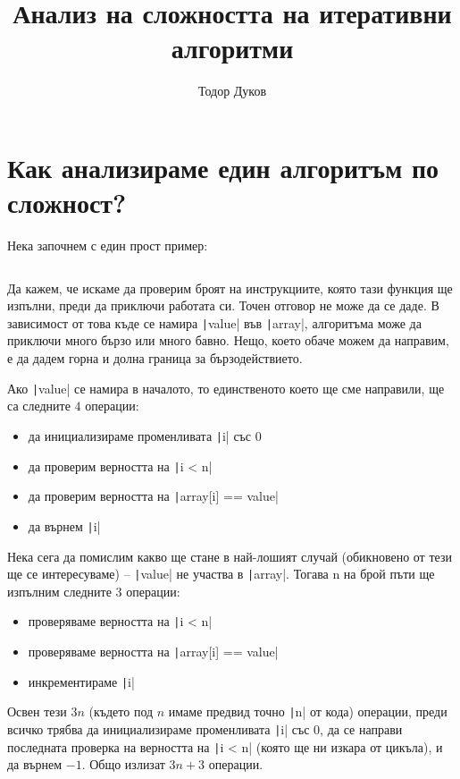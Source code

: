 \documentclass{article}
\title{Анализ на сложността на итеративни алгоритми}
\author{Тодор Дуков}
\date{}
\theoremstyle{definition}
\theoremstyle{plain}
\theoremstyle{remark}
\theoremstyle{definition}
\begin{document}
\maketitle

\section*{Как анализираме един алгоритъм по сложност?}

Нека започнем с един прост пример:

\inputminted[linenos]{c++}{algorithms/find.cpp}

Да кажем, че искаме да проверим броят на инструкциите, която тази функция ще изпълни, преди да приключи работата си.
Точен отговор не може да се даде.
В зависимост от това къде се намира \texttt|value| във \texttt|array|, алгоритъма може да приключи много бързо или много бавно.
Нещо, което обаче можем да направим, е да дадем горна и долна граница за бързодействието.

Ако \texttt|value| се намира в началото, то единственото което ще сме направили, ще са следните $4$ операции:
\begin{itemize}
    \item да инициализираме променливата \texttt|i| със $0$
    \item да проверим верността на \texttt|i < n|
    \item да проверим верността на \texttt|array[i] == value|
    \item да върнем \texttt|i|
\end{itemize}

Нека сега да помислим какво ще стане в най-лошият случай (обикновено от тези ще се интересуваме) -- \texttt|value| не участва в \texttt|array|.
Тогава n на брой пъти ще изпълним следните $3$ операции:
\begin{itemize}
    \item проверяваме верността на \texttt|i < n|
    \item проверяваме верността на \texttt|array[i] == value|
    \item инкрементираме \texttt|i|
\end{itemize}
Освен тези $3n$ (където под $n$ имаме предвид точно \texttt|n| от кода) операции, преди всичко трябва да инициализираме променливата \texttt|i| със $0$, да се направи последната проверка на верността на \texttt|i < n| (която ще ни изкара от цикъла), и да върнем $-1$.
Общо излизат $3n + 3$ операции.
\end{document}
